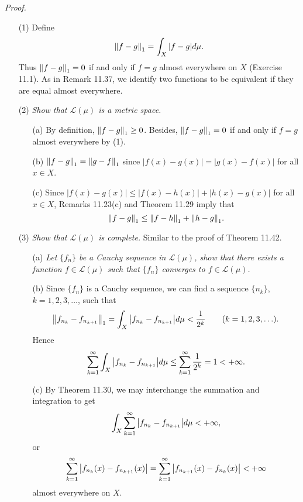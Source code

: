 \documentclass{article}
\begin{document}
\emph{Proof.}
\begin{enumerate}
\item[(1)]
  Define
  \[
    \norm{f-g}_1 = \int_{X} |f-g| d\mu.
  \]
  Thus $\norm{f-g}_1 = 0$ if and only if $f = g$ almost everywhere on $X$ (Exercise 11.1).
  As in Remark 11.37, we identify two functions to be equivalent
  if they are equal almost everywhere.

\item[(2)]
  \emph{Show that $\mathscr{L}(\mu)$ is a metric space.}
  \begin{enumerate}
  \item[(a)]
    By definition, $\norm{f-g}_1 \geq 0$.
    Besides, $\norm{f-g}_1 = 0$ if and only if $f = g$ almost everywhere by (1).

  \item[(b)]
    $\norm{f-g}_1 = \norm{g-f}_1$ since $|f(x)-g(x)| = |g(x)-f(x)|$ for all $x \in X$.

  \item[(c)]
    Since $|f(x)-g(x)| \leq |f(x)-h(x)| + |h(x)-g(x)|$ for all $x \in X$,
    Remarks 11.23(c) and Theorem 11.29 imply that
    \[
      \norm{f-g}_1 \leq \norm{f-h}_1 + \norm{h-g}_1.
    \]
  \end{enumerate}

\item[(3)]
  \emph{Show that $\mathscr{L}(\mu)$ is complete.}
  Similar to the proof of Theorem 11.42.
  \begin{enumerate}
  \item[(a)]
    \emph{Let $\{f_n\}$ be a Cauchy sequence in $\mathscr{L}(\mu)$,
    show that there exists a function $f \in \mathscr{L}(\mu)$ such that
    $\{f_n\}$ converges to $f \in \mathscr{L}(\mu)$.}

  \item[(b)]
    Since $\{f_n\}$ is a Cauchy sequence,
    we can find a sequence $\{n_k\}$, $k = 1,2,3,\ldots$, such that
    \[
      \norm{ f_{n_k} - f_{n_{k+1}} }_1
      = \int_{X} \abs{f_{n_k} - f_{n_{k+1}}} d\mu
      < \frac{1}{2^k}
      \qquad
      (k = 1,2,3,\ldots).
    \]
    Hence
    \[
      \sum_{k=1}^{\infty} \int_{X} \abs{f_{n_k} - f_{n_{k+1}}} d\mu
      \leq \sum_{k=1}^{\infty} \frac{1}{2^k}
      = 1
      < +\infty.
    \]

  \item[(c)]
    By Theorem 11.30, we may interchange the summation and integration to get
    \[
      \int_{X} \sum_{k=1}^{\infty} \abs{f_{n_k} - f_{n_{k+1}}} d\mu < +\infty,
    \]
    or
    \[
      \sum_{k=1}^{\infty} \abs{f_{n_k}(x) - f_{n_{k+1}}(x)}
      = \sum_{k=1}^{\infty} \abs{f_{n_{k+1}}(x) - f_{n_{k}}(x)}
      < +\infty
    \]
    almost everywhere on $X$.


\end{enumerate}
\end{enumerate}
\end{document}
